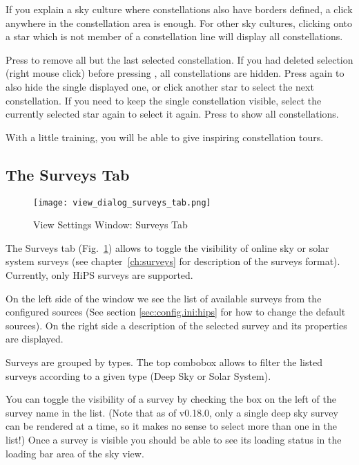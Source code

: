If you explain a sky culture where constellations also have borders
defined, a click anywhere in the constellation area is enough.  For
other sky cultures, clicking onto a star which is not member of a
constellation line will display all constellations.

Press  to remove all but the last selected constellation.
If you had deleted selection (right mouse click) before pressing ,
all constellations are hidden.
Press  again to also hide the single displayed one, or click
another star to select the next constellation. If you need to keep the
single constellation visible, select the currently selected star again
to select it again.  Press  to show all constellations.

With a little training, you will be able to give inspiring
constellation tours.

\subsection{The Surveys Tab}
\label{sec:gui:view:surveys}

\begin{figure}[htbp]
\centering\texttt{[image: view\_dialog\_surveys\_tab.png]}
\caption{View Settings Window: Surveys Tab}
\label{fig:gui:view:surveys}
\end{figure}

The Surveys tab (Fig.~\ref{fig:gui:view:surveys}) allows to toggle the
visibility of online sky or solar system surveys (see chapter~\ref{ch:surveys}
for description of the surveys format).  Currently, only HiPS surveys are
supported.

On the left side of the window we see the list of available surveys from
the configured sources (See section \ref{sec:config.ini:hips} for how to
change the default sources).  On the right side a description of the selected
survey and its properties are displayed.

Surveys are grouped by types. The top combobox allows to filter the listed
surveys according to a given type (Deep Sky or Solar System).

You can toggle the visibility of a survey by checking the box on the left
of the survey name in the list.  (Note that as of v0.18.0, only a single deep
sky survey can be rendered at a time, so it makes no sense to select more than one in
the list!) Once a survey is visible you should be able to see its loading
status in the loading bar area of the sky view.

